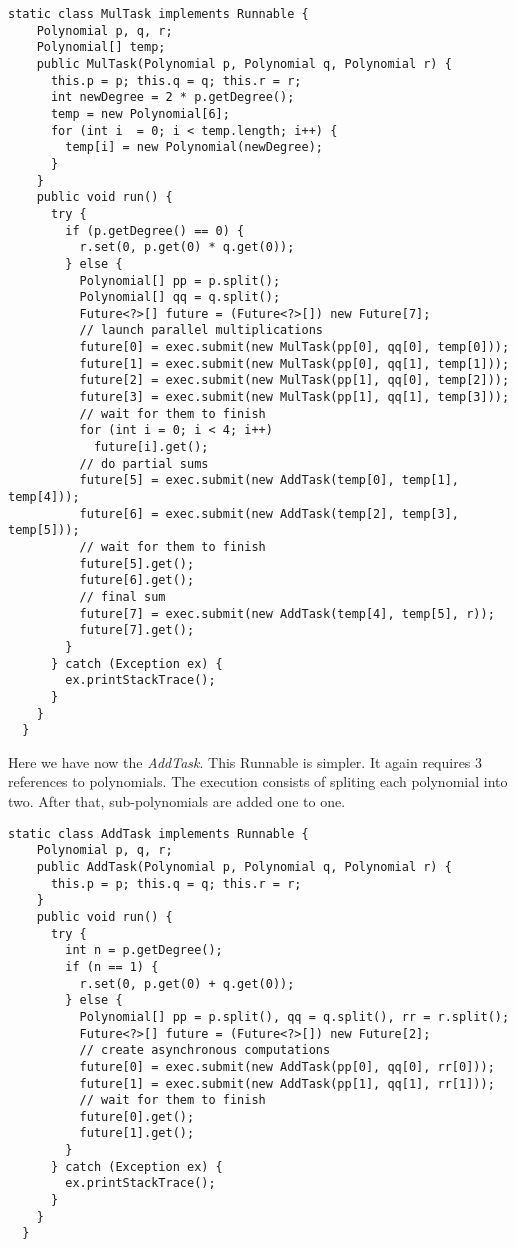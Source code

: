 \begin{lstlisting}[style=numbers]
  static class MulTask implements Runnable {
    Polynomial p, q, r;
    Polynomial[] temp;
    public MulTask(Polynomial p, Polynomial q, Polynomial r) {
      this.p = p; this.q = q; this.r = r;
      int newDegree = 2 * p.getDegree();
      temp = new Polynomial[6];
      for (int i  = 0; i < temp.length; i++) {
        temp[i] = new Polynomial(newDegree);
      }
    }
    public void run() {
      try {
        if (p.getDegree() == 0) {
          r.set(0, p.get(0) * q.get(0));
        } else {
          Polynomial[] pp = p.split();
          Polynomial[] qq = q.split();
          Future<?>[] future = (Future<?>[]) new Future[7];
          // launch parallel multiplications
          future[0] = exec.submit(new MulTask(pp[0], qq[0], temp[0]));
          future[1] = exec.submit(new MulTask(pp[0], qq[1], temp[1]));
          future[2] = exec.submit(new MulTask(pp[1], qq[0], temp[2]));
          future[3] = exec.submit(new MulTask(pp[1], qq[1], temp[3]));
          // wait for them to finish
          for (int i = 0; i < 4; i++)
            future[i].get();
          // do partial sums
          future[5] = exec.submit(new AddTask(temp[0], temp[1], temp[4]));
          future[6] = exec.submit(new AddTask(temp[2], temp[3], temp[5]));
          // wait for them to finish
          future[5].get();
          future[6].get();
          // final sum
          future[7] = exec.submit(new AddTask(temp[4], temp[5], r));
          future[7].get();
        }
      } catch (Exception ex) {
        ex.printStackTrace();
      }
    }
  }
\end{lstlisting}
\hfill
\par
Here we have now the \textit{AddTask}. This Runnable is simpler. It again
requires $3$ references to polynomials. The execution consists of spliting each
polynomial into two. After that, sub-polynomials are added one to one. 
\par
\hfill
\begin{lstlisting}[style=numbers]
  static class AddTask implements Runnable {
    Polynomial p, q, r;
    public AddTask(Polynomial p, Polynomial q, Polynomial r) {
      this.p = p; this.q = q; this.r = r;
    }
    public void run() {
      try {
        int n = p.getDegree();
        if (n == 1) {
          r.set(0, p.get(0) + q.get(0));
        } else {
          Polynomial[] pp = p.split(), qq = q.split(), rr = r.split();
          Future<?>[] future = (Future<?>[]) new Future[2];
          // create asynchronous computations
          future[0] = exec.submit(new AddTask(pp[0], qq[0], rr[0]));
          future[1] = exec.submit(new AddTask(pp[1], qq[1], rr[1]));
          // wait for them to finish
          future[0].get();
          future[1].get();
        }
      } catch (Exception ex) {
        ex.printStackTrace();
      }
    }
  }
\end{lstlisting}
\hfill
\par
